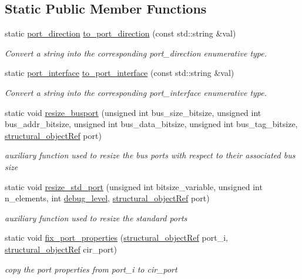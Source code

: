 \subsection*{Static Public Member Functions}
\begin{DoxyCompactItemize}
\item 
static \hyperlink{structport__o_adb254df5665ff28b0769491cc3899fd5}{port\+\_\+direction} \hyperlink{structport__o_a6e94ff71031344773513bc3985a65c41}{to\+\_\+port\+\_\+direction} (const std\+::string \&val)
\begin{DoxyCompactList}\small\item\em Convert a string into the corresponding port\+\_\+direction enumerative type. \end{DoxyCompactList}\item 
static \hyperlink{structport__o_a37d2e6a450aea997028478f5bfb4e1f6}{port\+\_\+interface} \hyperlink{structport__o_adfd39a77960a9240b2db38cfe45e3a24}{to\+\_\+port\+\_\+interface} (const std\+::string \&val)
\begin{DoxyCompactList}\small\item\em Convert a string into the corresponding port\+\_\+interface enumerative type. \end{DoxyCompactList}\item 
static void \hyperlink{structport__o_a4ad62789833bedbad40db7f2dba65fc6}{resize\+\_\+busport} (unsigned int bus\+\_\+size\+\_\+bitsize, unsigned int bus\+\_\+addr\+\_\+bitsize, unsigned int bus\+\_\+data\+\_\+bitsize, unsigned int bus\+\_\+tag\+\_\+bitsize, \hyperlink{structural__objects_8hpp_a8ea5f8cc50ab8f4c31e2751074ff60b2}{structural\+\_\+object\+Ref} port)
\begin{DoxyCompactList}\small\item\em auxiliary function used to resize the bus ports with respect to their associated bus size \end{DoxyCompactList}\item 
static void \hyperlink{structport__o_a43892ca0faac40059791c7a5e6235df5}{resize\+\_\+std\+\_\+port} (unsigned int bitsize\+\_\+variable, unsigned int n\+\_\+elements, int \hyperlink{classstructural__object_ac2744292aa7f0fca3742133d16bb3201}{debug\+\_\+level}, \hyperlink{structural__objects_8hpp_a8ea5f8cc50ab8f4c31e2751074ff60b2}{structural\+\_\+object\+Ref} port)
\begin{DoxyCompactList}\small\item\em auxiliary function used to resize the standard ports \end{DoxyCompactList}\item 
static void \hyperlink{structport__o_a92c2d286abadb846cf9134e69fb9590e}{fix\+\_\+port\+\_\+properties} (\hyperlink{structural__objects_8hpp_a8ea5f8cc50ab8f4c31e2751074ff60b2}{structural\+\_\+object\+Ref} port\+\_\+i, \hyperlink{structural__objects_8hpp_a8ea5f8cc50ab8f4c31e2751074ff60b2}{structural\+\_\+object\+Ref} cir\+\_\+port)
\begin{DoxyCompactList}\small\item\em copy the port properties from port\+\_\+i to cir\+\_\+port \end{DoxyCompactList}\end{DoxyCompactItemize}
